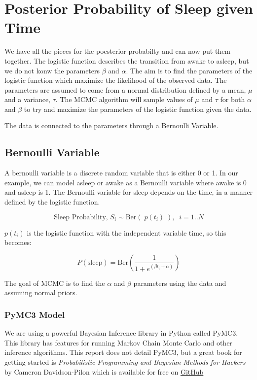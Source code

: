 \documentclass[12pt]{article}
\begin{document}
    \hypertarget{posterior-probability-of-sleep-given-time}{%
\section{Posterior Probability of Sleep given
Time}\label{posterior-probability-of-sleep-given-time}}

We have all the pieces for the poesterior probabilty and can now put
them together. The logistic function describes the transition from awake
to asleep, but we do not konw the parameters \(\beta\) and \(\alpha\).
The aim is to find the parameters of the logistic function which
maximize the likelihood of the observed data. The parameters are assumed
to come from a normal distribution defined by a mean, \(\mu\) and a
variance, \(\tau\). The MCMC algorithm will sample values of \(\mu\) and
\(\tau\) for both \(\alpha\) and \(\beta\) to try and maximize the
parameters of the logistic function given the data.

The data is connected to the parameters through a Bernoulli Variable.

\hypertarget{bernoulli-variable}{%
\subsection{Bernoulli Variable}\label{bernoulli-variable}}

A bernoulli variable is a discrete random variable that is either 0 or
1. In our example, we can model asleep or awake as a Bernoulli variable
where awake is 0 and asleep is 1. The Bernoulli variable for sleep
depends on the time, in a manner defined by the logistic function.

\[ \text{Sleep Probability, $S_i$} \sim \text{Ber}( \;p(t_i)\; ), \;\; i=1..N\]

\(p(t_i)\) is the logistic function with the independent variable time,
so this becomes:

\[ P(\text{sleep}) = \text{Ber}(\frac{1}{1 + e^{(\beta t_i + \alpha)}})\]

The goal of MCMC is to find the \(\alpha\) and \(\beta\) parameters
using the data and assuming normal priors.

    \hypertarget{pymc3-model}{%
\subsubsection{PyMC3 Model}\label{pymc3-model}}

We are using a powerful Bayesian Inference library in Python called
PyMC3. This library has features for running Markov Chain Monte Carlo
and other inference algorithms. This report does not detail PyMC3, but a
great book for getting started is \emph{Probabilistic Programming and
Bayesian Methods for Hackers} by Cameron Davidson-Pilon which is
available for free on
\href{https://github.com/CamDavidsonPilon/Probabilistic-Programming-and-Bayesian-Methods-for-Hackers}{GitHub}
\end{document}
